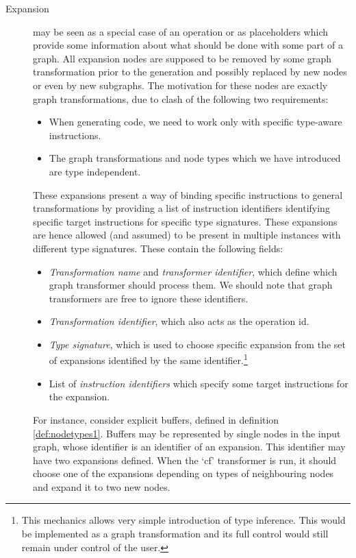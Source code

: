 \begin{description}
\begin{itemize}
    \end{itemize}
  \item[Expansion] may be seen as a special case of an operation or as placeholders which provide some information about what should be done with some part of a graph. All expansion nodes are supposed to be removed by some graph transformation prior to the generation and possibly replaced by new nodes or even by new subgraphs. The motivation for these nodes are exactly graph transformations, due to clash of the following two requirements:
    \begin{itemize}
      \item When generating code, we need to work only with specific type-aware instructions. 
      \item The graph transformations and node types which we have introduced are type independent. 
    \end{itemize}
    These expansions present a way of binding specific instructions to general transformations by providing a list of instruction identifiers identifying specific target instructions for specific type signatures. These expansions are hence allowed (and assumed) to be present in multiple instances with different type signatures. These contain the following fields:
    \begin{itemize}
      \item \emph{Transformation name} and \emph{transformer identifier}, which define which graph transformer should process them. We should note that graph transformers are free to ignore these identifiers.
      \item \emph{Transformation identifier}, which also acts as the operation id.
      \item \emph{Type signature}, which is used to choose specific expansion from the set of expansions identified by the same identifier.\footnote{This mechanics allows very simple introduction of type inference. This would be implemented as a graph transformation and its full control would still remain under control of the user.}
      \item List of \emph{instruction identifiers} which specify some target instructions for the expansion.
    \end{itemize}
    For instance, consider explicit buffers, defined in definition \ref{def:nodetypes1}. Buffers may be represented by single nodes in the input graph, whose identifier is an identifier of an expansion. This identifier may have two expansions defined. When the `cf' transformer is run, it should choose one of the expansions depending on types of neighbouring nodes and expand it to two new nodes.

\end{description}
